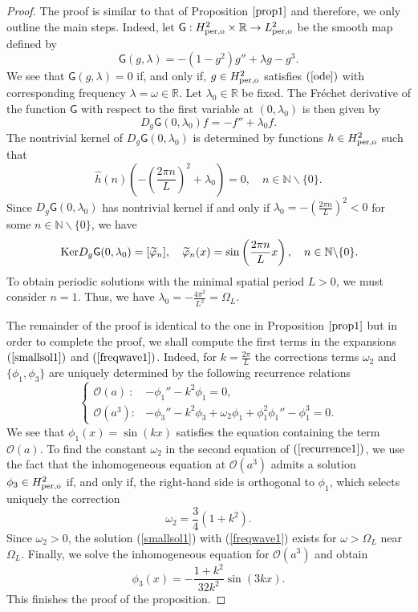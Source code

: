 \documentclass[12pt,reqno]{amsart}
\newcommand{\R}{{\mathbb R}}
\newcommand{\Ker}{{\rm \,Ker}}
\numberwithin{equation}{section}
\numberwithin{figure}{section}
\begin{document}
		\begin{proof} 
			The proof is similar to that of Proposition $\ref{prop1}$ and therefore, we only outline the main steps. Indeed, let $\mathsf{G}:H_{\rm per,o}^2 \times\mathbb{R} \rightarrow L_{\rm per,o}^2$ be the smooth map defined by
			$$
				\mathsf{G}(g,\lambda)=-(1-g^2)g''+\lambda g-g^3.
			$$
			We see that $\mathsf{G}(g,\lambda)=0$ if, and only if, $g\in H_{\rm per,o}^2$ satisfies $(\ref{ode})$ with corresponding frequency $\lambda = \omega \in \R$. Let $\lambda_0\in\mathbb{R}$ be fixed. The Fr\'echet derivative of the function $\mathsf{G}$ with respect to the first variable at $(0,\lambda_0)$ is then given by
			$$
				D_{g}\mathsf{G}(0,\lambda_0)f=-f''+\lambda_0f.
			$$
The nontrivial kernel of $	D_{g}\mathsf{G}(0,\lambda_0)$ is determined by functions $h\in H_{\rm per,o}^2$ such that 
$$
\widehat{h}(n)\left(-\left(\frac{2\pi n}{L}\right)^2+\lambda_0\right)=0, \quad 
n \in\mathbb{N}\backslash\{0\}.
$$ 
Since $D_{g}\mathsf{G}(0,\lambda_0)$ has nontrivial kernel if and only if $\lambda_0=-\left(\frac{2\pi n}{L}\right)^2<0$ for some $n\in\mathbb{N}\backslash\{0\}$, we have
$$	
\Ker D_{g}\mathsf{G}(0,\lambda_0) =[\widetilde{\varphi}_n], \quad \widetilde{\varphi}_n(x)=\sin\left(\frac{2\pi n}{L}x\right), 
\quad n\in\mathbb{N}\backslash\{0\}.
$$	
To obtain periodic solutions with the minimal spatial period $L > 0$, we must consider $n=1$. Thus, we have $\lambda_0 = -\frac{4 \pi^2}{L^2} = \Omega_L$. 
		
The remainder of the proof is identical to the one in Proposition $\ref{prop1}$ but in order to complete the proof, we shall compute the first terms in the expansions $(\ref{smallsol1})$ and $(\ref{freqwave1})$. Indeed, for $k=\frac{2\pi}{L}$ the corrections terms $\omega_2$ and $\{ \phi_1, \phi_3\}$ are uniquely determined by the following recurrence relations
\begin{equation}
\label{recurrence1}
\left\{\begin{array}{llllll}
\mathcal{O}(a)\ : &-\phi_1''-k^2\phi_1=0,\\
\mathcal{O}(a^3): &-\phi_3''-k^2\phi_3+\omega_2\phi_1+\phi_1^2\phi_1''-\phi_1^3=0.
\end{array}\right.
\end{equation}
We see that $\phi_1(x)=\sin(kx)$ satisfies the equation containing the term $\mathcal{O}(a)$. To find the constant $\omega_2$ in the second equation of $(\ref{recurrence1})$, we use the fact that the inhomogeneous equation at $\mathcal{O}(a^3)$ admits a solution $\phi_3 \in H^2_{\rm per,o}$ if, and only if, the right-hand side is orthogonal to $\phi_1$, which selects uniquely the
correction 
$$
\omega_2=\frac{3}{4}(1+k^2).
$$
Since $\omega_2 > 0$, the solution (\ref{smallsol1}) with (\ref{freqwave1}) 
exists for $\omega > \Omega_L$ near $\Omega_L$. Finally, we solve the inhomogeneous equation for $\mathcal{O}(a^3)$ and obtain 
$$
\phi_3(x)=-\frac{1+k^2}{32k^2}\sin(3kx).
$$
This finishes the proof of the proposition.
\end{proof}
			
\end{document}
